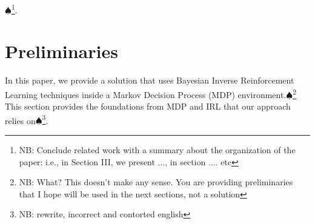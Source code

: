 \documentclass[conference]{IEEEtran}
\newcommand\NB[1]{$\spadesuit$\footnote{NB: #1}}
\begin{document}
\NB{Conclude related work with a summary about the organization of the paper: i.e., in Section III, we present ..., in section .... etc }.

\section{Preliminaries}\label{sec:Preliminaries}
In this paper, we provide a solution that uses Bayesian Inverse Reinforcement Learning techniques inside a Markov Decision Process (MDP) environment.\NB{What? This doesn't make any sense. You are providing preliminaries that I hope will be used in the next sections, not a solution} This section provides the foundations from MDP and IRL that our approach relies on\NB{rewrite, incorrect and contorted english}.
\end{document}
